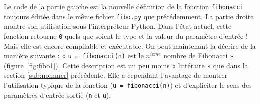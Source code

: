 \noindent  Le code de la partie gauche est la nouvelle définition de la fonction
{\tt fibonacci} toujours éditée dans le même fichier {\tt fibo.py} que précédemment. 
La partie droite montre son utilisation sous l'interpréteur {\sc Python}.
Dans l'état actuel, cette fonction retourne {\tt 0} quels que soient le type et la valeur
du paramètre d'entrée ! 
Mais elle est encore compilable et exécutable.
On peut maintenant la décrire de la manière suivante :
« {\tt u = fibonacci(n)} est le $n^{i\grave eme}$ nombre de Fibonacci » (figure~\ref{fig:fibo1}).
Cette description est un peu moins « littéraire » que dans la section \ref{sub:nommer} précédente.
Elle a cependant l'avantage de montrer l'utilisation typique de la fonction
({\tt u = fibonacci(n)}) et d'expliciter le sens des paramètres d'entrée-sortie
({\tt n} et {\tt u}).

